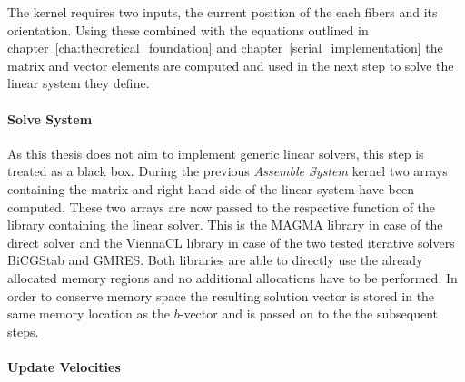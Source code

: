 \documentclass[a4paper,11pt]{kth-mag}
\begin{document}
The kernel requires two inputs, the current position of the each fibers and its orientation. Using these combined with the equations outlined in chapter~\ref{cha:theoretical_foundation} and chapter~\ref{serial_implementation} the matrix and vector elements are computed and used in the next step to solve the linear system they define.

\paragraph{Solve System}
As this thesis does not aim to implement generic linear solvers, this step is treated as a black box. During the previous \emph{Assemble System} kernel two arrays containing the matrix and right hand side of the linear system have been computed. These two arrays are now passed to the respective function of the library containing the linear solver. This is the MAGMA library in case of the direct solver and the ViennaCL library in case of the two tested iterative solvers BiCGStab and GMRES. Both libraries are able to directly use the already allocated memory regions and no additional allocations have to be performed. In order to conserve memory space the resulting solution vector is stored in the same memory location as the $b$-vector and is passed on to the the subsequent steps.

\paragraph{Update Velocities}
\end{document}
